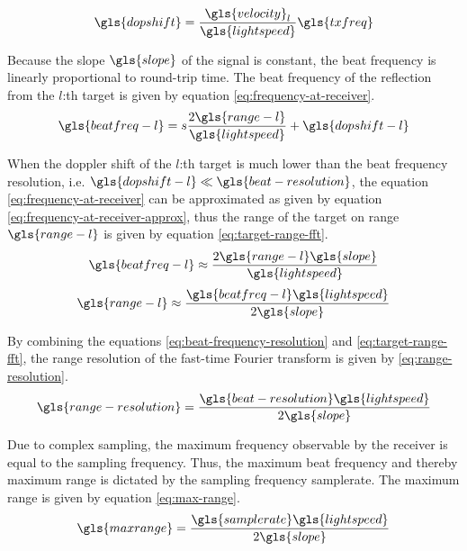 \begin{equation}
    \label{eq:beat-frequency-doppler}
    \gls{dopshift} = \frac{\gls{velocity}_{l}}{\gls{lightspeed}}\gls{txfreq}
\end{equation}

Because the slope $\gls{slope}$ of the signal is constant,
the beat frequency is linearly proportional to round-trip time.
The beat frequency of the reflection from the $l$:th target 
is given by equation \ref{eq:frequency-at-receiver}.
\begin{equation}
    \label{eq:frequency-at-receiver}
    \gls{beatfreq-l} = s \frac{2 \gls{range-l}}{\gls{lightspeed}} + \gls{dopshift-l}
\end{equation}

When the doppler shift of the $l$:th target is much lower than the beat frequency resolution, 
i.e. $\gls{dopshift-l} \ll \gls{beat-resolution} $, the equation \ref{eq:frequency-at-receiver} can be approximated
as given by equation \ref{eq:frequency-at-receiver-approx},
thus the range of the target on range $\gls{range-l}$ is given by equation \ref{eq:target-range-fft}.
\begin{equation}
    \label{eq:frequency-at-receiver-approx}
    \gls{beatfreq-l} \approx \frac{2 \gls{range-l} \gls{slope}}{\gls{lightspeed}}
\end{equation}
\begin{equation}
    \label{eq:target-range-fft}
    \gls{range-l} \approx \frac{\gls{beatfreq-l} \gls{lightspeed}}{2\gls{slope}}
\end{equation}

By combining the equations \ref{eq:beat-frequency-resolution} and \ref{eq:target-range-fft},
the range resolution of the fast-time Fourier transform is given by \ref{eq:range-resolution}.
\begin{equation}
    \label{eq:range-resolution}
    \gls{range-resolution} = \frac{\gls{beat-resolution} \gls{lightspeed}}{2\gls{slope}}
\end{equation}

Due to complex sampling, the maximum frequency observable by the receiver is
equal to the sampling frequency. Thus, the maximum beat frequency and thereby maximum range is dictated
by the sampling frequency \gls{samplerate}. The maximum range is given by equation \ref{eq:max-range}.
\begin{equation}
    \label{eq:max-range}
    \gls{maxrange} = \frac{\gls{samplerate} \gls{lightspeed}}{2\gls{slope}}
\end{equation}

